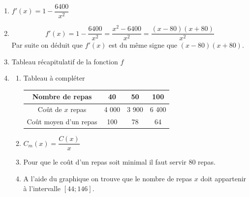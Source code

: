 \documentclass[french]{book}
\begin{document}
\begin{corrige}
\begin{enumerate}
\item $f'(x)=1- \dfrac{6400}{x^2}$
\item $$f'(x)=1- \dfrac{6400}{x^2}= \dfrac{x^2-6400}{x^2}=\dfrac{(x-80)(x+80)}{x^2}$$ 
Par suite on déduit que $f'(x)$ est du même signe que $(x-80)(x+80)$.
\item Tableau récapitulatif de la fonction $f$ 
\begin{center}
\end{center}
\item 
\begin{enumerate}
\item Tableau à compléter 
\begin{center}
\begin{tabular}{|c|c|c|c|}
\hline 
Nombre de repas & 40 & 50 & 100 \\ 
\hline 
Coût de $x$ repas & 4 000 & 3 900 & 6 400 \\ 
\hline 
 Coût moyen d'un repas & 100 & 78 & 64 \\ 
\hline 
\end{tabular} 
\end{center}
\item $C_m(x)=\dfrac{C(x)}{x}$
\item Pour que le coût d'un repas soit minimal il faut servir 80 repas. 
\item A l'aide du graphique on trouve que le nombre de repas $x$ doit appartenir à l'intervalle $[44;146]$.
\end{enumerate}
\end{enumerate}
\end{corrige}
\end{document}
